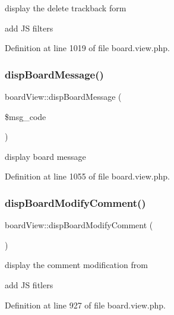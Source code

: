 display the delete trackback form 

add JS filters

Definition at line 1019 of file board.\+view.\+php.

\mbox{\label{classboardView_ae42a2efcaf9e04de795a8a895a68fad4}} 
\subsubsection{\texorpdfstring{disp\+Board\+Message()}{dispBoardMessage()}}
{\footnotesize\ttfamily board\+View\+::disp\+Board\+Message (\begin{DoxyParamCaption}\item[{}]{\$msg\+\_\+code }\end{DoxyParamCaption})}



display board message 



Definition at line 1055 of file board.\+view.\+php.

\mbox{\label{classboardView_a2c26d7a7ea01ac2f6dfd1dbe9c5effce}} 
\subsubsection{\texorpdfstring{disp\+Board\+Modify\+Comment()}{dispBoardModifyComment()}}
{\footnotesize\ttfamily board\+View\+::disp\+Board\+Modify\+Comment (\begin{DoxyParamCaption}{ }\end{DoxyParamCaption})}



display the comment modification from 

add JS fitlers

Definition at line 927 of file board.\+view.\+php.

\mbox{\label{classboardView_a3257103149e6136e3c0706b26d180dcb}} 
